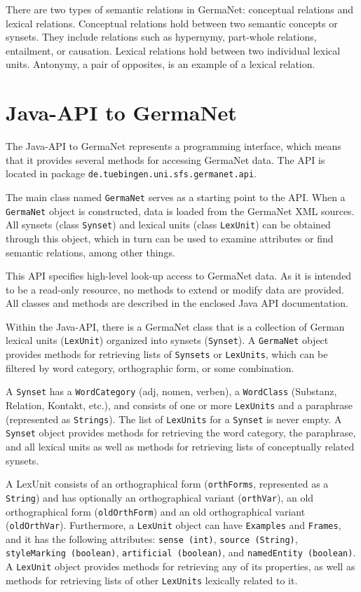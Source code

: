 \documentclass[12pt,a4paper,english,utf8]{report}
\begin{document}
There are two types of semantic relations in GermaNet: conceptual relations and lexical relations. Conceptual relations hold between two semantic concepts or synsets. They include relations such as hypernymy, part-whole relations, entailment, or causation. Lexical relations hold between two individual lexical units. Antonymy, a pair of opposites, is an example of a lexical relation.



\section{Java-API to GermaNet}
The Java-API to GermaNet represents a programming interface, which means that it provides several methods for accessing GermaNet data. The API is located in package \texttt{de.tuebingen.uni.sfs.germanet.api}.

The main class named \texttt{GermaNet} serves as a starting point to the API. When a \texttt{GermaNet} object is constructed, data is loaded from the GermaNet XML sources. All synsets (class \texttt{Synset}) and lexical units (class \texttt{LexUnit}) can be obtained through this object, which in turn can be used to examine attributes or find semantic relations, among other things.

This API specifies high-level look-up access to GermaNet data. As it is intended to be a read-only resource, no methods to extend or modify data are provided. All classes and methods are described in the enclosed Java API documentation.

Within the Java-API, there is a GermaNet class that is a collection of German lexical units (\texttt{LexUnit}) organized into synsets (\texttt{Synset}). A \texttt{GermaNet} object provides methods for retrieving lists of \texttt{Synsets} or \texttt{LexUnits}, which can be filtered by word category, orthographic form, or some combination.

A \texttt{Synset} has a \texttt{WordCategory} (adj, nomen, verben), a \texttt{WordClass} (Substanz, Relation, Kontakt, etc.), and consists of one or more \texttt{LexUnits} and a paraphrase (represented as \texttt{Strings}). The list of \texttt{LexUnits} for a \texttt{Synset} is never empty. A \texttt{Synset} object provides methods for retrieving the word category, the paraphrase, and all lexical units as well as methods for retrieving lists of conceptually related synsets.

\begin{sloppypar}
A LexUnit consists of an orthographical form (\texttt{orthForms}, represented as a \texttt{String}) and has optionally an orthographical variant (\texttt{orthVar}), an old orthographical form (\texttt{oldOrthForm}) and an old orthographical variant (\texttt{oldOrthVar}). Furthermore, a \texttt{LexUnit} object can have \texttt{Examples} and \texttt{Frames}, and it has the following attributes: \texttt{sense (int)}, \texttt{source (String)}, \texttt{styleMarking (boolean)}, \texttt{artificial (boolean)}, and \texttt{namedEntity (boolean)}. A \texttt{LexUnit} object provides methods for retrieving any of its properties, as well as methods for retrieving lists of other \texttt{LexUnits} lexically related to it.
\end{sloppypar}
\end{document}

